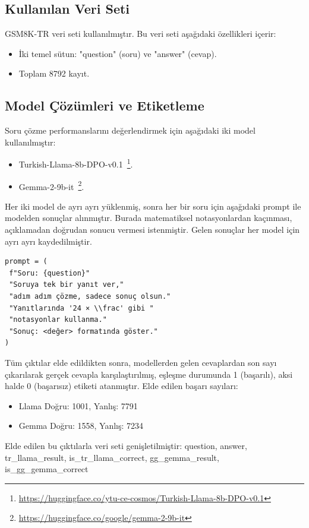 \documentclass[conference]{IEEEtran}
\begin{document}
\subsection{Kullanılan Veri Seti}
GSM8K-TR veri seti kullanılmıştır. Bu veri seti aşağıdaki özellikleri içerir:
\begin{itemize}
\item İki temel sütun: "question" (soru) ve "answer" (cevap).
\item Toplam 8792 kayıt.
\end{itemize}

\subsection{Model Çözümleri ve Etiketleme}
Soru çözme performanslarını değerlendirmek için aşağıdaki iki model kullanılmıştır:

\begin{itemize}
\item Turkish-Llama-8b-DPO-v0.1~\footnote{\url{https://huggingface.co/ytu-ce-cosmos/Turkish-Llama-8b-DPO-v0.1}}.
\item Gemma-2-9b-it~\footnote{\url{https://huggingface.co/google/gemma-2-9b-it}}.
\end{itemize}

Her iki model de ayrı ayrı yüklenmiş, sonra her bir soru için aşağıdaki prompt ile modelden sonuçlar alınmıştır. Burada matematiksel notasyonlardan kaçınması, açıklamadan doğrudan sonucu vermesi istenmiştir. Gelen sonuçlar her model için ayrı ayrı kaydedilmiştir.

\begin{verbatim}
prompt = (
 f"Soru: {question}"
 "Soruya tek bir yanıt ver,"
 "adım adım çözme, sadece sonuç olsun."
 "Yanıtlarında '24 × \\frac' gibi "
 "notasyonlar kullanma."
 "Sonuç: <değer> formatında göster."
)
\end{verbatim}

Tüm çıktılar elde edildikten sonra, modellerden gelen cevaplardan son sayı çıkarılarak gerçek cevapla karşılaştırılmış, eşleşme durumunda 1 (başarılı), aksi halde 0 (başarısız) etiketi atanmıştır. Elde edilen başarı sayıları:
\begin{itemize}
\item Llama Doğru: 1001, Yanlış: 7791
\item Gemma Doğru: 1558, Yanlış: 7234
\end{itemize}

Elde edilen bu çıktılarla veri seti genişletilmiştir: question, answer, tr\_llama\_result, is\_tr\_llama\_correct, gg\_gemma\_result, is\_gg\_gemma\_correct
\end{document}
